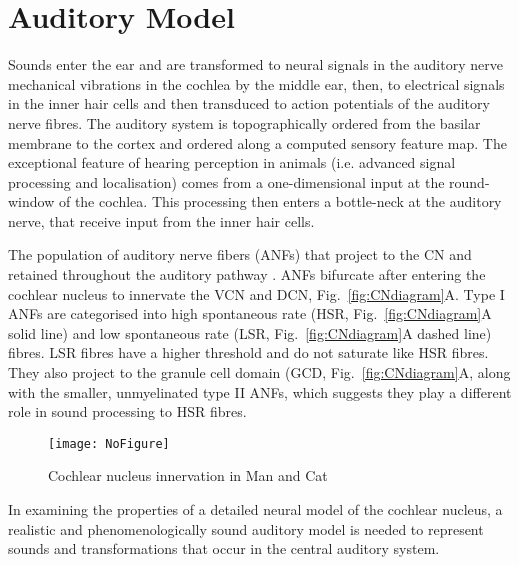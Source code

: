 \section{Auditory Model}

Sounds enter the ear and are transformed to neural signals in the auditory nerve
mechanical vibrations in
the cochlea by the middle ear, then, to electrical signals in the
inner hair cells and then transduced to action potentials of the
auditory nerve fibres. The auditory system is topographically ordered
from the basilar membrane to the cortex and ordered along a computed
sensory feature map.  The exceptional feature of hearing perception in
animals (i.e. advanced signal processing and localisation) comes from
a one-dimensional input at the round-window of the cochlea. This
processing then enters a bottle-neck at the auditory nerve, that
receive input from the inner hair cells.


The population of auditory nerve fibers (ANFs) that project to the CN
and retained throughout the auditory pathway
\citep{Lorente:1981}. ANFs bifurcate after entering the cochlear
nucleus to innervate the VCN and DCN, Fig.~\ref{fig:CNdiagram}A. Type
I ANFs are categorised into high spontaneous rate (HSR,
Fig.~\ref{fig:CNdiagram}A solid line) and low spontaneous rate (LSR,
Fig.~\ref{fig:CNdiagram}A dashed line) fibres. LSR fibres have a
higher threshold and do not saturate like HSR fibres. They also
project to the granule cell domain (GCD, Fig.~\ref{fig:CNdiagram}A,
\citep{RyugoParks:2003,RyugoHaenggeliEtAl:2003} along with the
smaller, unmyelinated type II ANFs, which suggests they play a
different role in sound processing to HSR fibres.


\begin{figure}[tbh]
\begin{center}
\texttt{[image: NoFigure]}
\caption{Cochlear nucleus innervation in Man and Cat }
\label{fig:CochlearNucleus}
\end{center}
\end{figure}


%
In examining the properties of a detailed neural model of the cochlear
nucleus, a realistic and phenomenologically sound auditory model is
needed to represent sounds and transformations that occur in the
central auditory system.

